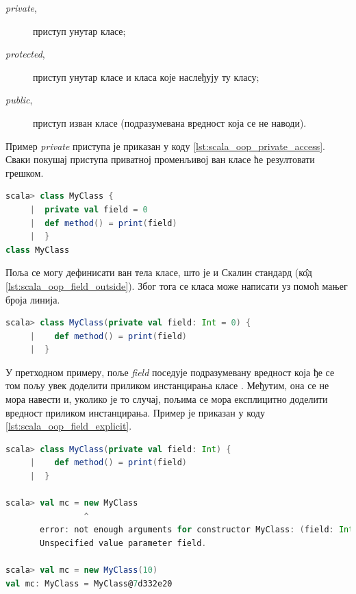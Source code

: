 \documentclass[12pt,oneside]{memoir}
\begin{document}
\begin{description}
\item[\textit{private},] приступ унутар класе;
\item[\textit{protected},] приступ унутар класе и класа које наслеђују ту класу;
\item[\textit{public},] приступ изван класе (подразумевана вредност која се не наводи).
\end{description}

Пример \textit{private} приступа је приказан у коду \ref{lst:scala_oop_private_access}. Сваки покушај приступа приватној променљивој ван класе ће резултовати грешком.

\begin{lstlisting}[language=Scala, caption={Пример \textit{private} правила приступа}, label={lst:scala_oop_private_access}]
scala> class MyClass {
     |  private val field = 0
     |  def method() = print(field)
     |  }
class MyClass

\end{lstlisting}


Поља се могу дефинисати ван тела класе, што је и Скалин стандард (к\^{о}д \ref{lst:scala_oop_field_outside}). Због тога се класа може написати уз помоћ мањег броја линија. 

\begin{lstlisting}[language=Scala, caption={Дефиниција поља ван тела класе}, label={lst:scala_oop_field_outside}]
scala> class MyClass(private val field: Int = 0) {
     |    def method() = print(field)
     |  }

\end{lstlisting}


У претходном примеру, поље \textit{field} поседује подразумевану вредност која ђе се том пољу увек доделити приликом инстанцирања класе \cite{scala_prog}. Међутим, она се не мора навести и, уколико је то случај, пољима се мора експлицитно доделити вредност приликом инстанцирања. Пример је приказан у коду \ref{lst:scala_oop_field_explicit}.

\begin{lstlisting}[language=Scala, caption={Инстанцирање класе без подразумеваних вредности поља}, label={lst:scala_oop_field_explicit}]
scala> class MyClass(private val field: Int) {
     |    def method() = print(field)
     |  }

scala> val mc = new MyClass
                ^
       error: not enough arguments for constructor MyClass: (field: Int): MyClass.
       Unspecified value parameter field.
     
scala> val mc = new MyClass(10)
val mc: MyClass = MyClass@7d332e20
\end{lstlisting}
\end{document}
